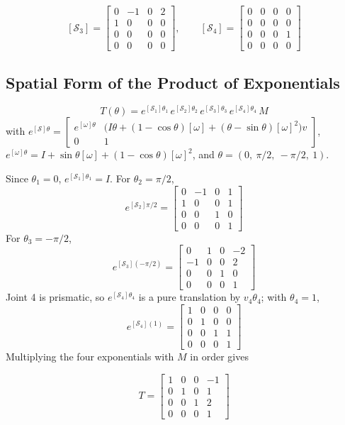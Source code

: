 \documentclass[11pt]{article}
\begin{document}
\[
[\mathcal S_3]=\begin{bmatrix}0&-1&0&2\\1&0&0&0\\0&0&0&0\\0&0&0&0\end{bmatrix}, \qquad
[\mathcal S_4]=\begin{bmatrix}0&0&0&0\\0&0&0&0\\0&0&0&1\\0&0&0&0\end{bmatrix}
\]

\subsection*{Spatial Form of the Product of Exponentials}
\[
T(\theta) = e^{[\mathcal S_1]\theta_1}\,e^{[\mathcal S_2]\theta_2}\,e^{[\mathcal S_3]\theta_3}\,e^{[\mathcal S_4]\theta_4}\,M
\]
with $e^{[\mathcal S]\theta}=\begin{bmatrix}e^{[\omega]\theta} & \big(I\theta+(1-\cos\theta)[\omega]+(\theta-\sin\theta)[\omega]^2\big)v\\0&1\end{bmatrix}$, $e^{[\omega]\theta}=I+\sin\theta[\omega]+(1-\cos\theta)[\omega]^2$, and $\theta=(0,\ \pi/2,\ -\pi/2,\ 1)$.

Since $\theta_1=0$, $e^{[\mathcal S_1]\theta_1}=I$. For $\theta_2=\pi/2$,
\[
e^{[\mathcal S_2]\pi/2} = \begin{bmatrix}0&-1&0&1\\1&0&0&1\\0&0&1&0\\0&0&0&1\end{bmatrix}
\]
For $\theta_3=-\pi/2$,
\[
e^{[\mathcal S_3](-\pi/2)} = \begin{bmatrix}0&1&0&-2\\-1&0&0&2\\0&0&1&0\\0&0&0&1\end{bmatrix}
\]
Joint 4 is prismatic, so $e^{[\mathcal S_4]\theta_4}$ is a pure translation by $v_4\theta_4$; with $\theta_4=1$,
\[
e^{[\mathcal S_4](1)} = \begin{bmatrix}1&0&0&0\\0&1&0&0\\0&0&1&1\\0&0&0&1\end{bmatrix}
\]
Multiplying the four exponentials with $M$ in order gives
\begin{result}
\[
T = \begin{bmatrix}1&0&0&-1\\0&1&0&1\\0&0&1&2\\0&0&0&1\end{bmatrix}
\]
\end{result}
\end{document}
